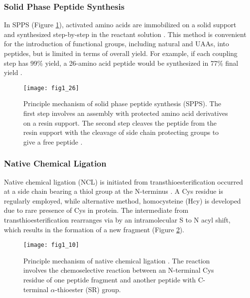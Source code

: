 \begin{refsection}
\subsubsection{Solid Phase Peptide Synthesis}

In SPPS  (Figure \ref{fig:spps-intro}), activated amino acids are
immobilized on a solid support and synthesized step-by-step in the reactant
solution \cite{Merrifield1963a}. This method is convenient for the introduction
of functional groups, including natural and UAAs, into
peptides, but is limited in terms of overall yield. For example, if each
coupling step has 99\% yield, a 26-amino acid peptide would be synthesized in
77\% final yield \cite{Chan2000}.  
\begin{figure}[htbp] \centering \texttt{[image: fig1\_26]}
    \caption[Principle mechanism of solid phase peptide synthesis (SPPS). The
    first step involves an assembly with protected amino acid derivatives on a
resin support. The second step cleaves the peptide from the resin support with
the cleavage of side chain protecting groups to give a free peptide.]{Principle
    mechanism of solid phase peptide synthesis (SPPS). The first step involves
    an assembly with protected amino acid derivatives on a resin support. The
    second step cleaves the peptide from the resin support with the cleavage of
    side chain protecting groups to give a free peptide
    \cite{Merrifield1963a,Mahto2011}.} 
    \label{fig:spps-intro} 
\end{figure}

\subsubsection{Native Chemical Ligation}

Native chemical ligation (NCL) is initiated from transthioesterification
occurred at a side chain bearing a thiol group at the N-terminus
\cite{Dawson1994}. A Cys residue is regularly employed, while alternative
method, homocysteine (Hcy) is developed due to rare presence of Cys in protein.
The intermediate from transthioesterification rearranges via by an
intramolecular S to N acyl shift, which results in the formation of a new
fragment (Figure \ref{fig:ncl-intro}).
\begin{figure}[htbp] \centering \texttt{[image: fig1\_10]}
    \caption[Princilple mechanism of native chemical ligation. The reaction
    involves the chemoselective reaction between an N-terminal Cys residue of
one peptide fragment and another peptide with C-terminal $\alpha$-thioester
(SR) group.]{Principle mechanism of native chemical ligation \cite{Theato2013}.
The reaction involves the chemoselective reaction between an N-terminal Cys
residue of one peptide fragment and another peptide with C-terminal
$\alpha$-thioester (SR) group.} 
\label{fig:ncl-intro} 
\end{figure}


\end{refsection}
